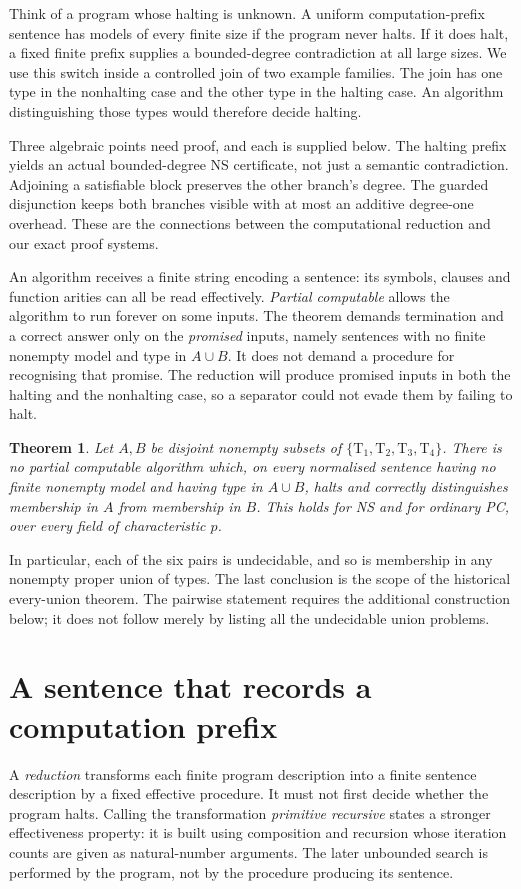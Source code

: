 \documentclass[11pt,a4paper,oneside,openany]{book}
\newtheorem{theorem}{Theorem}[chapter]
\theoremstyle{definition}\newtheorem{definition}[theorem]{Definition}
\theoremstyle{remark}\newtheorem{remark}[theorem]{Remark}
\numberwithin{equation}{chapter}
\begin{document}
Think of a program whose halting is unknown. A uniform computation-prefix
sentence has models of every finite size if the program never halts.
If it does halt, a fixed finite prefix supplies a bounded-degree
contradiction at all large sizes. We use this switch inside a controlled
join of two example families. The join has one type in the nonhalting
case and the other type in the halting case. An algorithm distinguishing
those types would therefore decide halting.

Three algebraic points need proof, and each is supplied below. The
halting prefix yields an actual bounded-degree NS certificate, not just
a semantic contradiction. Adjoining a satisfiable block preserves the
other branch's degree. The guarded disjunction keeps both branches
visible with at most an additive degree-one overhead. These are the
connections between the computational reduction and our exact proof
systems.

An algorithm receives a finite string encoding a sentence: its symbols,
clauses and function arities can all be read effectively. \emph{Partial
computable} allows the algorithm to run forever on some inputs.
The theorem demands termination and a correct answer only on the
\emph{promised} inputs, namely sentences with no finite nonempty model
and type in $A\cup B$. It does not demand a procedure for recognising
that promise. The reduction will produce promised inputs in both
the halting and the nonhalting case, so a separator could not evade
them by failing to halt.

\begin{theorem}\label{tx:thm:undecidability}
Let $A,B$ be disjoint nonempty subsets of $\{\mathrm T_1,\mathrm T_2,
\mathrm T_3,\mathrm T_4\}$. There is no partial computable algorithm which,
on every normalised sentence having no finite nonempty model and having
type in $A\cup B$, halts and correctly distinguishes membership in $A$
from membership in $B$. This holds for NS and for ordinary PC, over every
field of characteristic $p$.
\end{theorem}

In particular, each of the six pairs is undecidable, and so is membership
in any nonempty proper union of types. The last conclusion is the scope
of the historical every-union theorem. The pairwise statement requires the
additional construction below; it does not follow merely by listing all
the undecidable union problems.

\section{A sentence that records a computation prefix}
A \emph{reduction} transforms each finite program description into a
finite sentence description by a fixed effective procedure. It must
not first decide whether the program halts. Calling the transformation
\emph{primitive recursive} states a stronger effectiveness property:
it is built using composition and recursion whose iteration counts
are given as natural-number arguments. The later unbounded search is performed by the
program, not by the procedure producing its sentence.
\end{document}
